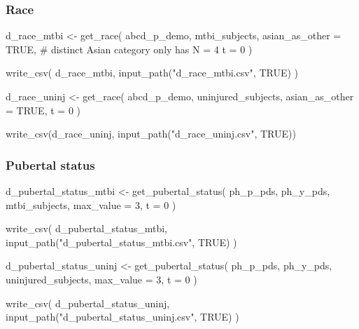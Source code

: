 \documentclass[
  letterpaper,
  DIV=11,
  numbers=noendperiod]{scrreprt}
\newenvironment{Shaded}{\begin{snugshade}}{\end{snugshade}}
\newcommand{\AttributeTok}[1]{\textcolor[rgb]{0.40,0.45,0.13}{#1}}
\newcommand{\CommentTok}[1]{\textcolor[rgb]{0.37,0.37,0.37}{#1}}
\newcommand{\ConstantTok}[1]{\textcolor[rgb]{0.56,0.35,0.01}{#1}}
\newcommand{\DecValTok}[1]{\textcolor[rgb]{0.68,0.00,0.00}{#1}}
\newcommand{\FunctionTok}[1]{\textcolor[rgb]{0.28,0.35,0.67}{#1}}
\newcommand{\NormalTok}[1]{\textcolor[rgb]{0.00,0.23,0.31}{#1}}
\newcommand{\OtherTok}[1]{\textcolor[rgb]{0.00,0.23,0.31}{#1}}
\newcommand{\StringTok}[1]{\textcolor[rgb]{0.13,0.47,0.30}{#1}}
\begin{document}
\subsubsection{Race}\label{race}

\begin{Shaded}
\begin{Highlighting}[]
\NormalTok{d\_race\_mtbi }\OtherTok{\textless{}{-}} \FunctionTok{get\_race}\NormalTok{(}
\NormalTok{    abcd\_p\_demo,}
\NormalTok{    mtbi\_subjects,}
    \AttributeTok{asian\_as\_other =} \ConstantTok{TRUE}\NormalTok{, }\CommentTok{\# distinct Asian category only has N = 4}
    \AttributeTok{t =} \DecValTok{0}
\NormalTok{)}

\FunctionTok{write\_csv}\NormalTok{(}
\NormalTok{    d\_race\_mtbi,}
    \FunctionTok{input\_path}\NormalTok{(}\StringTok{"d\_race\_mtbi.csv"}\NormalTok{, }\ConstantTok{TRUE}\NormalTok{)}
\NormalTok{)}

\NormalTok{d\_race\_uninj }\OtherTok{\textless{}{-}} \FunctionTok{get\_race}\NormalTok{(}
\NormalTok{    abcd\_p\_demo,}
\NormalTok{    uninjured\_subjects,}
    \AttributeTok{asian\_as\_other =} \ConstantTok{TRUE}\NormalTok{,}
    \AttributeTok{t =} \DecValTok{0}
\NormalTok{)}

\FunctionTok{write\_csv}\NormalTok{(d\_race\_uninj, }\FunctionTok{input\_path}\NormalTok{(}\StringTok{"d\_race\_uninj.csv"}\NormalTok{, }\ConstantTok{TRUE}\NormalTok{))}
\end{Highlighting}
\end{Shaded}

\subsubsection{Pubertal status}\label{pubertal-status}

\begin{Shaded}
\begin{Highlighting}[]
\NormalTok{d\_pubertal\_status\_mtbi }\OtherTok{\textless{}{-}} \FunctionTok{get\_pubertal\_status}\NormalTok{(}
\NormalTok{    ph\_p\_pds,}
\NormalTok{    ph\_y\_pds,}
\NormalTok{    mtbi\_subjects,}
    \AttributeTok{max\_value =} \DecValTok{3}\NormalTok{,}
    \AttributeTok{t =} \DecValTok{0}
\NormalTok{)}

\FunctionTok{write\_csv}\NormalTok{(}
\NormalTok{    d\_pubertal\_status\_mtbi,}
    \FunctionTok{input\_path}\NormalTok{(}\StringTok{"d\_pubertal\_status\_mtbi.csv"}\NormalTok{, }\ConstantTok{TRUE}\NormalTok{)}
\NormalTok{)}

\NormalTok{d\_pubertal\_status\_uninj }\OtherTok{\textless{}{-}} \FunctionTok{get\_pubertal\_status}\NormalTok{(}
\NormalTok{    ph\_p\_pds,}
\NormalTok{    ph\_y\_pds,}
\NormalTok{    uninjured\_subjects,}
    \AttributeTok{max\_value =} \DecValTok{3}\NormalTok{,}
    \AttributeTok{t =} \DecValTok{0}
\NormalTok{)}

\FunctionTok{write\_csv}\NormalTok{(}
\NormalTok{    d\_pubertal\_status\_uninj,}
    \FunctionTok{input\_path}\NormalTok{(}\StringTok{"d\_pubertal\_status\_uninj.csv"}\NormalTok{, }\ConstantTok{TRUE}\NormalTok{)}
\NormalTok{)}
\end{Highlighting}
\end{Shaded}
\end{document}
